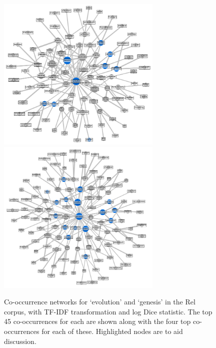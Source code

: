 \documentclass{article}
\begin{document}
\begin{figure}
    \centering
    \includegraphics[width=0.7\textwidth]{images/evo_network_main.png}
    \includegraphics[width=0.7\textwidth]{images/genesis_main.png}
    \caption{\footnotesize{Co-occurrence networks for `evolution' and `genesis' in the Rel corpus, with TF-IDF transformation and log Dice statistic. The top 45 co-occurrences for each are shown along with the four top co-occurrences for each of these. Highlighted nodes are to aid discussion.}}
    \label{f:evo-net}
\end{figure}
\end{document}
